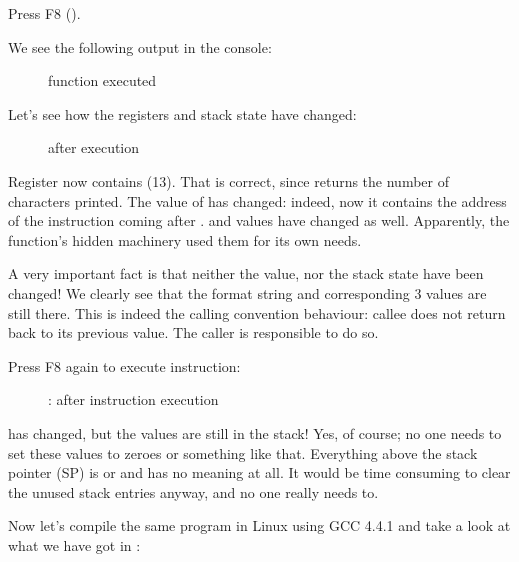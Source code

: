 \clearpage
Press F8 (\stepover).

We see the following output in the console:

\begin{figure}[H]
\centering
{}
\caption{\printf function executed}
\end{figure}

Let's see how the registers and stack state have changed: 

\begin{figure}[H]
\centering
{}
\caption{\olly after \printf{} execution}
\label{fig:printf3_olly_3}
\end{figure}

Register \EAX now contains  (13).
That is correct, since \printf returns the number of characters printed. 
The value of \EIP has changed: indeed, now it contains the address of the instruction coming after 
.
\ECX and \EDX values have changed as well.
Apparently, the \printf function's hidden machinery used them for its own needs.

A very important fact is that neither the \ESP value, nor the stack state have been changed!
We clearly see that the format string and corresponding 3 values are still there.
This is indeed the  calling convention behaviour: \gls{callee} does not return \ESP back to its previous value.
The \gls{caller} is responsible to do so.

\clearpage
Press F8 again to execute  instruction:

\begin{figure}[H]
\centering
{}
\caption{\olly: after  instruction execution}
\label{fig:printf3_olly_4}
\end{figure}

\ESP has changed, but the values are still in the stack!
Yes, of course; no one needs to set these values to zeroes or something like that.
Everything above the stack pointer (\ac{SP}) 
is  or \IT{\garbage{}} and has no meaning at all.
It would be time consuming to clear the unused stack entries anyway, and no one really needs to.


Now let's compile the same program in Linux using GCC 4.4.1 and take a look at what we have got in \IDA:

